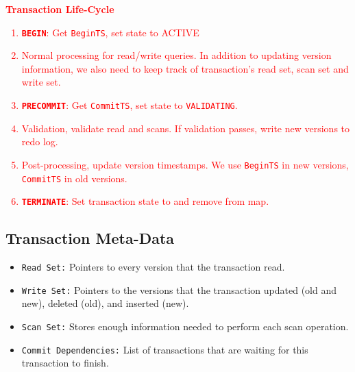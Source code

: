 \documentclass[11pt]{article}
\newcommand{\rr}[1]{\textcolor{red}{#1}}
\begin{document}
\rr{\textbf{Transaction Life-Cycle}}
\rr{\begin{enumerate}
    \item \textbf{\texttt{BEGIN}}: Get \texttt{BeginTS}, set state to ACTIVE
    \item Normal processing for read/write queries. In addition to updating version information, we also need to keep track of transaction's read set, scan set and write set.
    \item \textbf{\texttt{PRECOMMIT}}: Get \texttt{CommitTS}, set state to \texttt{VALIDATING}.
    \item Validation, validate read and scans. If validation passes, write new versions to redo log.
    \item Post-processing, update version timestamps. We use \texttt{BeginTS} in new versions, \texttt{CommitTS} in old versions.
    \item \textbf{\texttt{TERMINATE}}: Set transaction state to \text{TERMINATED} and remove from map.
\end{enumerate}}

\subsection*{Transaction Meta-Data}
\begin{itemize}
    \item \texttt{Read Set:}
    Pointers to every version that the transaction read.
    
    \item \texttt{Write Set:}
    Pointers to the versions that the transaction updated (old and new), deleted (old), 
    and inserted (new).
    
    \item \texttt{Scan Set:}
    Stores enough information needed to perform each scan operation.
    
    \item \texttt{Commit Dependencies:}
    List of transactions that are waiting for this transaction to finish.
\end{itemize}
\end{document}
